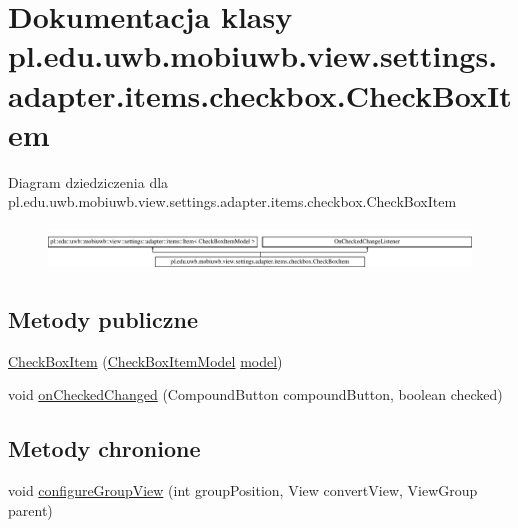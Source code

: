 \hypertarget{classpl_1_1edu_1_1uwb_1_1mobiuwb_1_1view_1_1settings_1_1adapter_1_1items_1_1checkbox_1_1_check_box_item}{}\section{Dokumentacja klasy pl.\+edu.\+uwb.\+mobiuwb.\+view.\+settings.\+adapter.\+items.\+checkbox.\+Check\+Box\+Item}
\label{classpl_1_1edu_1_1uwb_1_1mobiuwb_1_1view_1_1settings_1_1adapter_1_1items_1_1checkbox_1_1_check_box_item}
Diagram dziedziczenia dla pl.\+edu.\+uwb.\+mobiuwb.\+view.\+settings.\+adapter.\+items.\+checkbox.\+Check\+Box\+Item\begin{figure}[H]
\begin{center}
\leavevmode
\includegraphics[height=1.191489cm]{classpl_1_1edu_1_1uwb_1_1mobiuwb_1_1view_1_1settings_1_1adapter_1_1items_1_1checkbox_1_1_check_box_item}
\end{center}
\end{figure}
\subsection*{Metody publiczne}
\begin{DoxyCompactItemize}
\item 
\hyperlink{classpl_1_1edu_1_1uwb_1_1mobiuwb_1_1view_1_1settings_1_1adapter_1_1items_1_1checkbox_1_1_check_box_item_aa74567ff7e4f7af2dcacf39d45fa8943}{Check\+Box\+Item} (\hyperlink{classpl_1_1edu_1_1uwb_1_1mobiuwb_1_1view_1_1settings_1_1adapter_1_1items_1_1checkbox_1_1_check_box_item_model}{Check\+Box\+Item\+Model} \hyperlink{classpl_1_1edu_1_1uwb_1_1mobiuwb_1_1view_1_1settings_1_1adapter_1_1items_1_1_item_a318c5a53677362bdb6d6324d8f132ba6}{model})
\item 
void \hyperlink{classpl_1_1edu_1_1uwb_1_1mobiuwb_1_1view_1_1settings_1_1adapter_1_1items_1_1checkbox_1_1_check_box_item_a880e46da483e317f688862bab4b74976}{on\+Checked\+Changed} (Compound\+Button compound\+Button, boolean checked)
\end{DoxyCompactItemize}
\subsection*{Metody chronione}
\begin{DoxyCompactItemize}
\item 
void \hyperlink{classpl_1_1edu_1_1uwb_1_1mobiuwb_1_1view_1_1settings_1_1adapter_1_1items_1_1checkbox_1_1_check_box_item_ab1d4e59255c983c379d130ef50cc5646}{configure\+Group\+View} (int group\+Position, View convert\+View, View\+Group parent)
\end{DoxyCompactItemize}
